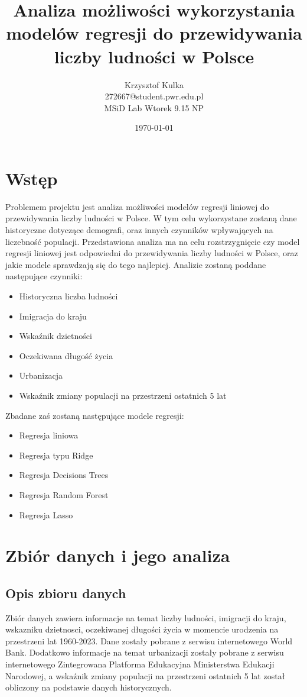 \documentclass[11pt]{article}
\title{ Analiza możliwości wykorzystania modelów regresji do przewidywania liczby ludności w Polsce}
\author{ Krzysztof Kulka
        \\ 272667@student.pwr.edu.pl \\ MSiD Lab Wtorek 9.15 NP }
\date{\today}
\begin{document}
\maketitle	
\pagebreak

\tableofcontents
 \pagebreak


\section{Wstęp}
Problemem projektu jest analiza możliwości modelów regresji liniowej do przewidywania liczby ludności w Polsce. W tym celu wykorzystane zostaną dane historyczne dotyczące demografi, oraz innych czynników wpływających na liczebność populacji.
Przedstawiona analiza ma na celu rozstrzygnięcie czy model regresji liniowej jest odpowiedni do przewidywania liczby ludności w Polsce, oraz jakie modele sprawdzają się do tego najlepiej.
Analizie zostaną poddane następujące czynniki:
\begin{itemize}
\item Historyczna liczba ludności
\item Imigracja do kraju
\item Wskaźnik dzietności
\item Oczekiwana długość życia
\item Urbanizacja
\item Wskaźnik zmiany populacji na przestrzeni ostatnich 5 lat
\end{itemize}
Zbadane zaś zostaną następujące modele regresji:
\begin{itemize}
\item Regresja liniowa
\item Regresja typu Ridge
\item Regresja Decisions Trees
\item Regresja Random Forest
\item Regresja Lasso
\end{itemize}
\section{Zbiór danych i jego analiza}
\subsection*{Opis zbioru danych}
Zbiór danych zawiera informacje na temat liczby ludności, imigracji do kraju, wskazniku dzietnosci, oczekiwanej długości życia w momencie urodzenia na przestrzeni lat 1960-2023.
Dane zostały pobrane z serwisu internetowego World Bank\cite{wbd}. 
Dodatkowo informacje na temat urbanizacji
zostały pobrane z serwisu internetowego Zintegrowana Platforma Edukacyjna Ministerstwa Edukacji Narodowej\cite{zpe}, a wskaźnik zmiany populacji na przestrzeni ostatnich 5 lat został obliczony na podstawie danych historycznych.



\end{document}
